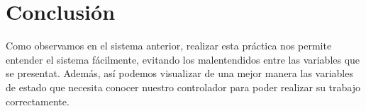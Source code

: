\documentclass[12pt, letterpaper]{article}
\begin{document}
\section*{Conclusión}

Como observamos en el sistema anterior, realizar esta práctica nos permite entender el sistema fácilmente, evitando los malentendidos entre las variables que se presentat. Además, así podemos visualizar de una mejor manera las variables de estado que necesita conocer nuestro controlador para poder realizar su trabajo correctamente.
\renewcommand\refname{Referencias}
\printbibliography
\end{document}

